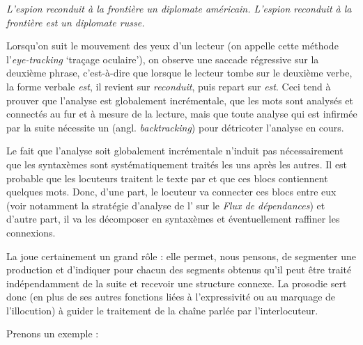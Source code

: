 {    \ea
      \ea \itshape L’espion reconduit à la frontière un diplomate américain.
      \ex \itshape L’espion reconduit à la frontière est un diplomate russe.
      \z
    \z

     Lorsqu’on suit le mouvement des yeux d’un lecteur (on appelle cette méthode l’\textit{eye-tracking} ‘traçage oculaire’), on observe une saccade régressive sur la deuxième phrase, c’est-à-dire que lorsque le lecteur tombe sur le deuxième verbe, la forme verbale \textit{est}, il revient sur \textit{reconduit}, puis repart sur \textit{est}. Ceci tend à prouver que l’analyse est globalement incrémentale, que les mots sont analysés et connectés au fur et à mesure de la lecture, mais que toute analyse qui est infirmée par la suite nécessite un  (angl. \textit{backtracking}) pour détricoter l’analyse en cours.

    Le fait que l’analyse soit globalement incrémentale n’induit pas nécessairement que les syntaxèmes sont systématiquement traités les uns après les autres. Il est probable que les locuteurs traitent le texte par  et que ces blocs contiennent quelques mots. Donc, d’une part, le locuteur va connecter ces blocs entre eux (voir notamment la stratégie d’analyse de l' sur le \textit{Flux de dépendances}) et d’autre part, il va les décomposer en syntaxèmes et éventuellement raffiner les connexions.

    La  joue certainement un grand rôle : elle permet, nous pensons, de segmenter une production et d’indiquer pour chacun des segments obtenus qu’il peut être traité indépendamment de la suite et recevoir une structure connexe. La prosodie sert donc (en plus de ses autres fonctions liées à l’expressivité ou au marquage de l’illocution) à guider le traitement de la chaîne parlée par l’interlocuteur.

    Prenons un exemple : 
    
}
